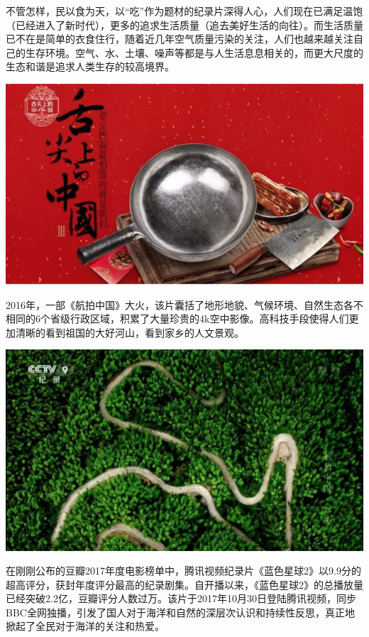 \documentclass[
]{book}
\begin{document}
不管怎样，民以食为天，以``吃''作为题材的纪录片深得人心，人们现在已满足温饱（已经进入了新时代），更多的追求生活质量（追去美好生活的向往）。而生活质量已不在是简单的衣食住行，随着近几年空气质量污染的关注，人们也越来越关注自己的生存环境。空气、水、土壤、噪声等都是与人生活息息相关的，而更大尺度的生态和谐是追求人类生存的较高境界。

\includegraphics[width=8.33in]{images/xf2}

2016年，一部《航拍中国》大火，该片囊括了地形地貌、气候环境、自然生态各不相同的6个省级行政区域，积累了大量珍贵的4k空中影像。高科技手段使得人们更加清晰的看到祖国的大好河山，看到家乡的人文景观。

\includegraphics[width=8.33in]{images/xf3}

在刚刚公布的豆瓣2017年度电影榜单中，腾讯视频纪录片《蓝色星球2》以9.9分的超高评分，获封年度评分最高的纪录剧集。自开播以来，《蓝色星球2》的总播放量已经突破2.2亿，豆瓣评分人数过万。该片于2017年10月30日登陆腾讯视频，同步BBC全网独播，引发了国人对于海洋和自然的深层次认识和持续性反思，真正地掀起了全民对于海洋的关注和热爱。
\end{document}
